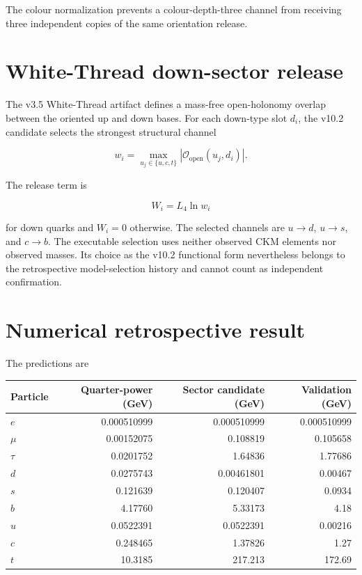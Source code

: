 The colour normalization prevents a colour-depth-three channel from receiving
three independent copies of the same orientation release.

\section{White-Thread down-sector release}

The v3.5 White-Thread artifact defines a mass-free open-holonomy overlap
between the oriented up and down bases.  For each down-type slot $d_i$, the
v10.2 candidate selects the strongest structural channel

\[
w_i=\max_{u_j\in\{u,c,t\}}
\left|\mathcal O_{\mathrm{open}}(u_j,d_i)\right|.
\]

The release term is

\begin{equation}
W_i=L_4\ln w_i
\label{eq:white_thread_release}
\end{equation}

for down quarks and $W_i=0$ otherwise.  The selected channels are
$u\rightarrow d$, $u\rightarrow s$, and $c\rightarrow b$.  The executable
selection uses neither observed CKM elements nor observed masses.  Its choice
as the v10.2 functional form nevertheless belongs to the retrospective
model-selection history and cannot count as independent confirmation.

\section{Numerical retrospective result}

The predictions are

\begin{center}
\begin{tabular}{lrrr}
\toprule
Particle & Quarter-power (GeV) & Sector candidate (GeV) & Validation (GeV)\\
\midrule
$e$   & 0.000510999 & 0.000510999 & 0.000510999\\
$\mu$ & 0.00152075  & 0.108819    & 0.105658\\
$\tau$& 0.0201752   & 1.64836     & 1.77686\\
$d$   & 0.0275743   & 0.00461801  & 0.00467\\
$s$   & 0.121639    & 0.120407    & 0.0934\\
$b$   & 4.17760     & 5.33173     & 4.18\\
$u$   & 0.0522391   & 0.0522391   & 0.00216\\
$c$   & 0.248465    & 1.37826     & 1.27\\
$t$   & 10.3185     & 217.213     & 172.69\\
\bottomrule
\end{tabular}
\end{center}

